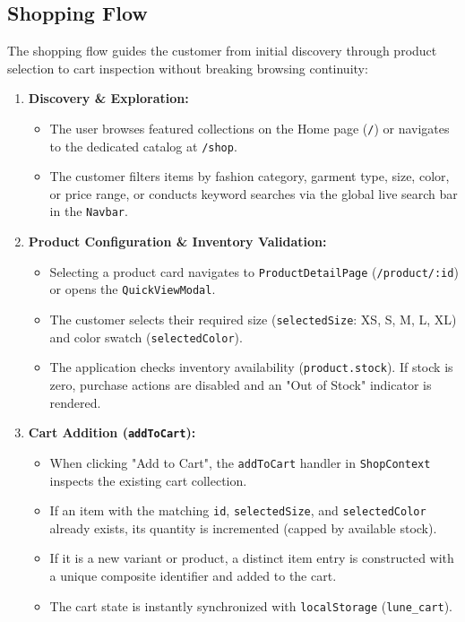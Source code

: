 \documentclass[12pt,a4paper,oneside]{report}
\begin{document}
\subsection{Shopping Flow}
The shopping flow guides the customer from initial discovery through product selection to cart inspection without breaking browsing continuity:
\begin{enumerate}[leftmargin=1.2cm]
    \item \textbf{Discovery \& Exploration:}
    \begin{itemize}[nosep]
        \item The user browses featured collections on the Home page (\texttt{/}) or navigates to the dedicated catalog at \texttt{/shop}.
        \item The customer filters items by fashion category, garment type, size, color, or price range, or conducts keyword searches via the global live search bar in the \texttt{Navbar}.
    \end{itemize}
    \item \textbf{Product Configuration \& Inventory Validation:}
    \begin{itemize}[nosep]
        \item Selecting a product card navigates to \texttt{ProductDetailPage} (\texttt{/product/:id}) or opens the \texttt{QuickViewModal}.
        \item The customer selects their required size (\texttt{selectedSize}: XS, S, M, L, XL) and color swatch (\texttt{selectedColor}).
        \item The application checks inventory availability (\texttt{product.stock}). If stock is zero, purchase actions are disabled and an "Out of Stock" indicator is rendered.
    \end{itemize}
    \item \textbf{Cart Addition (\texttt{addToCart}):}
    \begin{itemize}[nosep]
        \item When clicking "Add to Cart", the \texttt{addToCart} handler in \texttt{ShopContext} inspects the existing cart collection.
        \item If an item with the matching \texttt{id}, \texttt{selectedSize}, and \texttt{selectedColor} already exists, its quantity is incremented (capped by available stock).
        \item If it is a new variant or product, a distinct item entry is constructed with a unique composite identifier and added to the cart.
        \item The cart state is instantly synchronized with \texttt{localStorage} (\texttt{lune\_cart}).

\end{itemize}
\end{enumerate}
\end{document}
